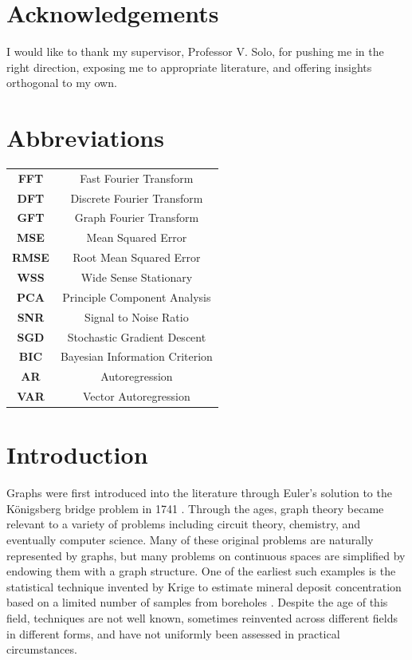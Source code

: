 \documentclass[12pt,a4paper]{article} %
\begin{document}
\newpage
{}
\setcounter{page}{1}
\section*{Acknowledgements}
I would like to thank my supervisor, Professor V. Solo, for pushing me in the right direction, exposing me to appropriate literature, and offering insights orthogonal to my own.

\newpage
\section*{Abbreviations}
\begin{tabular}{cc}
    \textbf{FFT} & Fast Fourier Transform \\
    \textbf{DFT} & Discrete Fourier Transform \\
    \textbf{GFT} & Graph Fourier Transform \\
    \textbf{MSE} & Mean Squared Error \\
    \textbf{RMSE} & Root Mean Squared Error \\
    \textbf{WSS} & Wide Sense Stationary \\
    \textbf{PCA} & Principle Component Analysis \\
    \textbf{SNR} & Signal to Noise Ratio \\
    \textbf{SGD} & Stochastic Gradient Descent \\
    \textbf{BIC} & Bayesian Information Criterion \\
    \textbf{AR}  & Autoregression \\
    \textbf{VAR} & Vector Autoregression
\end{tabular}
\newpage
\tableofcontents

\newpage
\section{Introduction}
Graphs were first introduced into the literature through Euler's solution to the K\"{o}nigsberg bridge problem in 1741 \cite{euler}. Through the ages, graph theory became relevant to a variety of problems including circuit theory, chemistry, and eventually computer science. Many of these original problems are naturally represented by graphs, but many problems on continuous spaces are simplified by endowing them with a graph structure. One of the earliest such examples is the statistical technique invented by Krige to estimate mineral deposit concentration based on a limited number of samples from boreholes \cite{krige}. Despite the age of this field, techniques are not well known, sometimes reinvented across different fields in different forms, and have not uniformly been assessed in practical circumstances.
\end{document}
